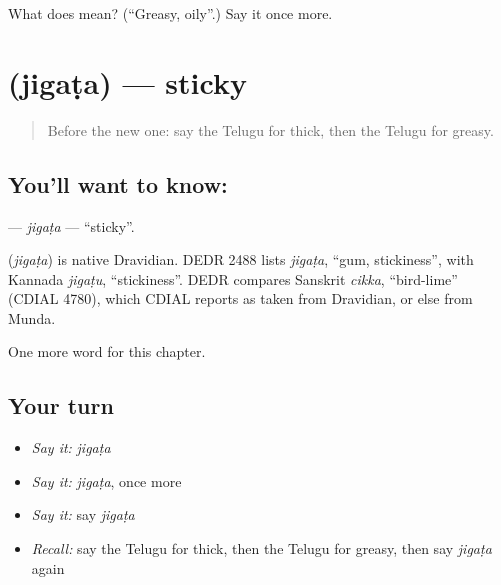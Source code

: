 \begin{tcolorbox}[breakable,colback=teal!4,colframe=teal!35!black,title={Before you move on}]
What does  mean? (\textquotedblleft{}Greasy, oily\textquotedblright{}.) Say it once more.
\end{tcolorbox}
\section[\texorpdfstring{\te{జిగట} (jigaṭa)}{జిగట (jigaṭa)}]{ (jigaṭa) — sticky}

\label{lesson:TE-C261-jigata}



\begin{quote}
Before the new one: say the Telugu for thick, then the Telugu for greasy.
\end{quote}

\subsection*{You'll want to know: }
\textbf{} — \emph{jigaṭa} — \textquotedblleft{}sticky\textquotedblright{}.

\begin{cousinweb}
\textbf{} (\emph{jigaṭa}) is native Dravidian. DEDR 2488 lists \emph{jigaṭa}, \textquotedblleft{}gum, stickiness\textquotedblright{}, with Kannada \emph{jigaṭu}, \textquotedblleft{}stickiness\textquotedblright{}. DEDR compares Sanskrit \emph{cikka}, \textquotedblleft{}bird-lime\textquotedblright{} (CDIAL 4780), which CDIAL reports as taken from Dravidian, or else from Munda.
\end{cousinweb}

\begin{grammarlens}[title={What you've built}]
One more word for this chapter.
\end{grammarlens}

\subsection*{Your turn}
\begin{itemize}
\raggedright
  \item \emph{Say it:} \emph{jigaṭa}
  \item \emph{Say it:} \emph{jigaṭa}, once more
  \item \emph{Say it:} say \emph{jigaṭa}
  \item \emph{Recall:} say the Telugu for thick, then the Telugu for greasy, then say \emph{jigaṭa} again
\end{itemize}

